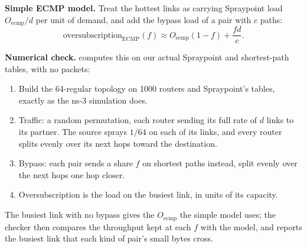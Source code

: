 \textbf{Simple ECMP model.} Treat the hottest links as carrying Spraypoint load $O_{\text{ecmp}}/d$ per unit of demand, and add the bypass load of a pair with $c$ paths:
\[
\text{oversubscription}_{\text{ECMP}}(f) \approx O_{\text{ecmp}} (1 - f) + \frac{f d}{c}.
\]

\textbf{Numerical check.}  computes this on our actual Spraypoint and shortest-path tables, with no packets:
\begin{enumerate}
  \item Build the 64-regular topology on 1000 routers and Spraypoint's tables, exactly as the ns-3 simulation does.
  \item Traffic: a random permutation, each router sending its full rate of $d$ links to its partner. The source sprays $1/64$ on each of its links, and every router splits evenly over its next hops toward the destination.
  \item Bypass: each pair sends a share $f$ on shortest paths instead, split evenly over the next hops one hop closer.
  \item Oversubscription is the load on the busiest link, in units of its capacity.
\end{enumerate}

The busiest link with no bypass gives the $O_{\text{ecmp}}$ the simple model uses; the checker then compares the throughput kept at each $f$ with the model, and reports the busiest link that each kind of pair's small bytes cross.
